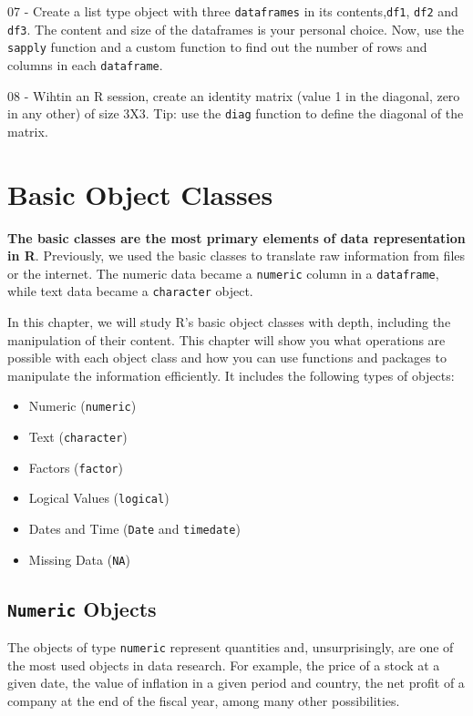 \documentclass[
  12pt,
]{book}
\providecommand{\tightlist}{%
  \setlength{\itemsep}{0pt}\setlength{\parskip}{0pt}}
\begin{document}
07 -
Create a list type object with three \texttt{dataframes} in its contents,\texttt{df1}, \texttt{df2} and \texttt{df3}. The content and size of the dataframes is your personal choice. Now, use the \texttt{sapply} function and a custom function to find out the number of rows and columns in each \texttt{dataframe}.

08 -
Wihtin an R session, create an identity matrix (value 1 in the diagonal, zero in any other) of size 3X3. Tip: use the \texttt{diag} function to define the diagonal of the matrix.

\hypertarget{basic-classes}{%
\chapter{Basic Object Classes}\label{basic-classes}}

\textbf{The basic classes are the most primary elements of data representation in R}. Previously, we used the basic classes to translate raw information from files or the internet. The numeric data became a \texttt{numeric} column in a \texttt{dataframe}, while text data became a \texttt{character} object.

In this chapter, we will study R's basic object classes with depth, including the manipulation of their content. This chapter will show you what operations are possible with each object class and how you can use functions and packages to manipulate the information efficiently. It includes the following types of objects:

\begin{itemize}
\tightlist
\item
  Numeric (\texttt{numeric})
\item
  Text (\texttt{character})
\item
  Factors (\texttt{factor})
\item
  Logical Values (\texttt{logical})
\item
  Dates and Time (\texttt{Date} and \texttt{timedate})
\item
  Missing Data (\texttt{NA})
\end{itemize}

\hypertarget{numeric-objects}{%
\section{\texorpdfstring{\texttt{Numeric} Objects}{Numeric Objects}}\label{numeric-objects}}

The objects of type \texttt{numeric} represent quantities and, unsurprisingly, are one of the most used objects in data research. For example, the price of a stock at a given date, the value of inflation in a given period and country, the net profit of a company at the end of the fiscal year, among many other possibilities.
\end{document}
